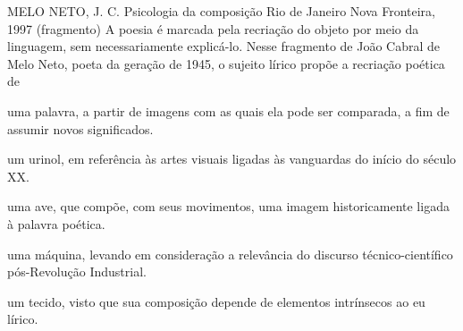 \questao
{} {
  MELO NETO, J. C. Psicologia da composição Rio de Janeiro Nova Fronteira, 1997 (fragmento)
}
A poesia é marcada pela recriação do objeto por meio da linguagem, sem necessariamente explicá-lo. Nesse fragmento de João Cabral de Melo Neto, poeta da geração de 1945, o sujeito lírico propõe a recriação poética de
\begin{alternativas}
  \item uma palavra, a partir de imagens com as quais ela pode ser comparada, a fim de assumir novos significados.
  \item um urinol, em referência às artes visuais ligadas às vanguardas do início do século XX.
  \item uma ave, que compõe, com seus movimentos, uma imagem historicamente ligada à palavra poética.
  \item uma máquina, levando em consideração a relevância do discurso técnico-científico pós-Revolução Industrial.
  \item um tecido, visto que sua composição depende de elementos intrínsecos ao eu lírico.
\end{alternativas}

